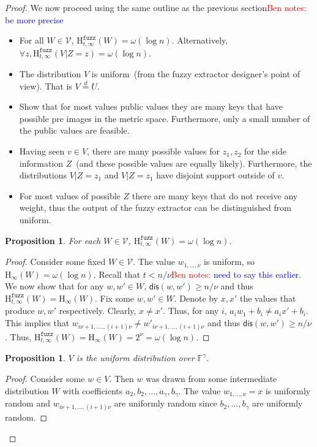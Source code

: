 \documentclass[11pt]{article}
\newcommand{\dis}{\ensuremath{\mathsf{dis}}}
\newcommand{\Hoo}{\mathrm{H}_\infty}
\newcommand{\Hfuzz}{\mathrm{H}^{\mathtt{fuzz}}_{t,\infty}}
\newtheorem{proposition}[theorem]{Proposition}
\newcommand{\authnote}[2]{{\textcolor{red}{\textsf{#1 notes: }\textcolor{blue}{ #2}}\marginpar{\textcolor{red}{\textbf{!!!!!}}}}}
\newcommand{\authnote}[2]{}
\newcommand{\bnote}[1]{{\authnote{Ben}{#1}}}
\begin{document}
\begin{proof}
We now proceed using the same outline as the previous section\bnote{be more precise}
\begin{itemize}
\item For all $W\in \mathcal{V}$, $\Hfuzz(W) = \omega (\log n)$. Alternatively, $\forall z, \Hfuzz(V | Z=z) = \omega(\log n)$.
\item The distribution $V$ is uniform~(from the fuzzy extractor designer's point of view).  That is $V\overset{d}=U$.
\item Show that for most values public values they are many keys that have possible pre images in the metric space.  Furthermore, only a small number of the public values are feasible.
\item Having seen $v\in V$, there are many possible values for $z_1, z_2$ for the side information $Z$~(and these possible values are equally likely).  Furthermore, the distributions $V|Z=z_1 $ and $V| Z=z_1$ have disjoint support outside of $v$.
\item For most values of possible $Z$ there are many keys that do not receive any weight, thus the output of the fuzzy extractor can be distinguished from uniform.
\end{itemize}

\begin{proposition} 
For each $W\in\mathcal{V}$, $\Hfuzz(W) = \omega(\log n)$.
\end{proposition}
\begin{proof}
Consider some fixed $W\in\mathcal{V}$.  The value $w_{1,..., \nu}$ is uniform, so $\Hoo(W) =\omega(\log n)$.  Recall that $t< n/\nu$\bnote{need to say this earlier}.  We now show that for any $w, w'\in W$, $\dis(w, w') \ge n/\nu$ and thus $\Hfuzz(W) = \Hoo(W)$.  Fix some $w, w'\in W$.  Denote by $x, x'$ the values that produce $w, w'$ respectively.  Clearly, $x\neq x'$.  Thus, for any $i$, $a_i w_1 + b_i \neq a_i x' + b_i$.  This implies that $w_{i\nu+1,...., (i+1)\nu} \neq w'_{i\nu+1,..., (i+1)\nu}$ and thus $\dis(w, w') \ge n/\nu$.  Thus, $\Hfuzz(W) = \Hoo(W)= 2^\nu = \omega(\log n)$.
\end{proof}

\begin{proposition}$V$ is the uniform distribution over $\mathbb{F}^\gamma$.
\end{proposition}
\begin{proof}
Consider some $w\in V$.  Then $w$ was drawn from some intermediate distribution $W$ with coefficients $a_2, b_2, ..., a_\gamma , b_\gamma$.  The value $w_{1,...,\nu} =x $ is uniformly random and $w_{i\nu+1,...,(i+1)\nu}$ are uniformly random since $b_2,..., b_\gamma$ are uniformly random.
\end{proof}


\end{proof}
\end{document}
